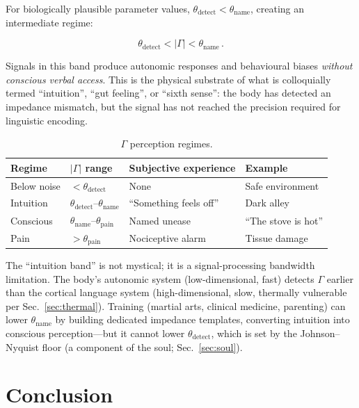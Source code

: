 \documentclass[aps,pre,twocolumn,superscriptaddress,floatfix]{revtex4-2}
\begin{document}
For biologically plausible parameter values,
$\theta_{\text{detect}} < \theta_{\text{name}}$, creating
an intermediate regime:

\begin{equation}
  \theta_{\text{detect}} < |\Gamma| < \theta_{\text{name}}\,.
  \label{eq:intuition-band}
\end{equation}

Signals in this band produce autonomic responses and
behavioural biases \emph{without conscious verbal access}.
This is the physical substrate of what is colloquially
termed ``intuition'', ``gut feeling'', or ``sixth sense'':
the body has detected an impedance mismatch, but the signal
has not reached the precision required for linguistic
encoding.

\begin{table}[h]
\centering
\caption{$\Gamma$ perception regimes.}
\label{tab:gamma-regimes}
\begin{tabular}{@{}llll@{}}
\toprule
Regime & $|\Gamma|$ range & Subjective experience & Example \\
\midrule
Below noise & $< \theta_{\text{detect}}$ & None & Safe environment \\
Intuition & $\theta_{\text{detect}}$--$\theta_{\text{name}}$ &
  ``Something feels off'' & Dark alley \\
Conscious & $\theta_{\text{name}}$--$\theta_{\text{pain}}$ &
  Named unease & ``The stove is hot'' \\
Pain & $> \theta_{\text{pain}}$ &
  Nociceptive alarm & Tissue damage \\
\bottomrule
\end{tabular}
\end{table}

The ``intuition band'' is not mystical; it is a
signal-processing bandwidth limitation.
The body's autonomic system (low-dimensional, fast)
detects $\Gamma$ earlier than the cortical language system
(high-dimensional, slow, thermally vulnerable per
Sec.~\ref{sec:thermal}).
Training (martial arts, clinical medicine, parenting)
can lower $\theta_{\text{name}}$ by building dedicated
impedance templates, converting intuition into conscious
perception---but it cannot lower
$\theta_{\text{detect}}$, which is set by the
Johnson--Nyquist floor (a component of the soul;
Sec.~\ref{sec:soul}).


\section{Conclusion}
\label{sec:conclusion}
\end{document}
